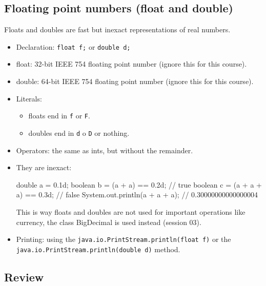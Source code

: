 \documentclass[8pt, a4paper, oneside]{extarticle}
\begin{document}
\subsection{Floating point numbers (float and double)}

Floats and doubles are fast but inexact representations of real numbers.

\begin{itemize}

  \item Declaration: \verb+float f;+ or \verb+double d;+

  \item float: 32-bit IEEE 754 floating point number (ignore this for this course).

  \item double: 64-bit IEEE 754 floating point number (ignore this for this course).

  \item Literals:

    \begin{itemize}

      \item floats end in \verb'f' or \verb'F'.

      \item doubles end in \verb'd' o \verb'D' or nothing.

    \end{itemize}

  \item Operators: the same as ints, but without the remainder.

  \item They are inexact:

\begin{blackboard}
double a = 0.1d;
boolean b = (a + a) == 0.2d; // true
boolean c = (a + a + a) == 0.3d; // false
System.out.println(a + a + a); // 0.30000000000000004
\end{blackboard}

    This is way floats and doubles are not used for important operations like
    currency, the class BigDecimal is used instead (session 03).

  \item Printing: using the \verb+java.io.PrintStream.println(float f)+ or the
    \verb+java.io.PrintStream.println(double d)+ method.

\end{itemize}

\subsection{Review}
\end{document}
